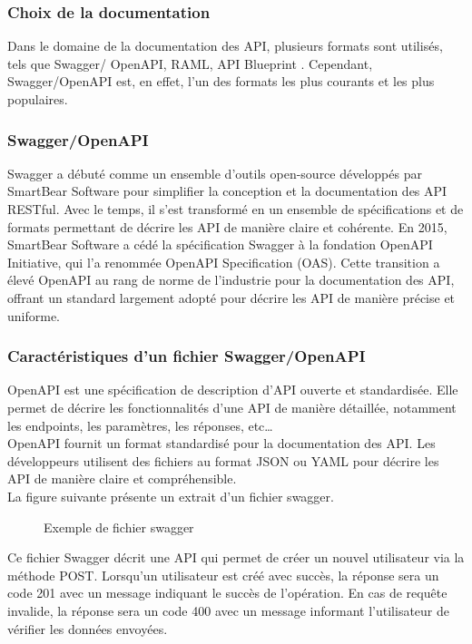     \subsubsection{Choix de la documentation  }
    Dans le domaine de la documentation des API, plusieurs formats sont utilisés, tels que Swagger/ OpenAPI, RAML, API Blueprint . Cependant, Swagger/OpenAPI est, en effet, l'un des formats les plus courants et les plus populaires.
    \subsubsection{Swagger/OpenAPI }

    Swagger a débuté comme un ensemble d'outils open-source développés par SmartBear Software pour simplifier la conception et la documentation des API RESTful. Avec le temps, il s'est transformé en un ensemble de spécifications et de formats permettant de décrire les API de manière claire et cohérente. En 2015, SmartBear Software a cédé la spécification Swagger à la fondation OpenAPI Initiative, qui l'a renommée OpenAPI Specification (OAS).
    Cette transition a élevé OpenAPI au rang de norme de l'industrie pour la documentation des API, offrant un standard largement adopté pour décrire les API de manière précise et uniforme. \cite[]{Swagger}

    \subsubsection{Caractéristiques d'un fichier Swagger/OpenAPI  }
    OpenAPI est une spécification de description d'API ouverte et standardisée. Elle permet de décrire les fonctionnalités d'une API de manière détaillée, notamment les endpoints, les paramètres, les réponses, etc… \\
    OpenAPI fournit un format standardisé pour la documentation des API. Les développeurs utilisent des fichiers au format JSON ou YAML pour décrire les API de manière claire et compréhensible.\cite[]{Swagger} \\
   La figure suivante présente un extrait d'un fichier swagger.
    \begin{figure}[H]    
    \centering
        \caption{Exemple de fichier swagger }
        \label{fig:logo_tt}
    \end{figure}
    Ce fichier Swagger décrit une API qui permet de créer un nouvel utilisateur via la méthode POST. 
    Lorsqu'un utilisateur est créé avec succès, la réponse sera un code 201 avec un message indiquant le succès de l'opération. 
    En cas de requête invalide, la réponse sera un code 400 avec un message informant l'utilisateur de vérifier les données envoyées. 
